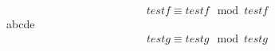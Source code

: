 

\begin{eqnarray*}
testf \equiv testf \mod testf
\end{eqnarray*}
abcde
\begin{eqnarray}
testg \equiv testg \mod testg
\end{eqnarray}
